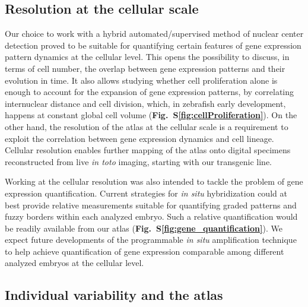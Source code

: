 \subsection*{Resolution at the cellular scale}

Our choice to work with a hybrid automated/supervised method of nuclear center detection proved to be suitable for quantifying certain features of gene expression pattern dynamics at the cellular level. This opens the possibility to discuss, in terms of cell number, the overlap between gene expression patterns and their evolution in time. It also allows studying whether cell proliferation alone is enough to account for the expansion of gene expression patterns, by correlating internuclear distance and cell division, which, in zebrafish early development, happens at constant global cell volume (\textbf{Fig.~S\ref{fig:cellProliferation}}). On the other hand, the resolution of the atlas at the cellular scale is a requirement to exploit the correlation between gene expression dynamics and cell lineage. Cellular resolution enables further mapping of the atlas onto digital specimens reconstructed from live \emph{in toto} imaging, starting with our transgenic line.

Working at the cellular resolution was also intended to tackle the problem of gene expression quantification. Current strategies for \emph{in situ} hybridization could at best provide relative measurements suitable for quantifying graded patterns and fuzzy borders within each analyzed embryo. Such a relative quantification would be readily available from our atlas (\textbf{Fig.~S\ref{fig:gene_quantification}}). We expect future developments of the programmable \emph{in situ} amplification technique\cite{choi2010} to help achieve quantification of gene expression comparable among different analyzed embryos at the cellular level.

\subsection*{Individual variability and the atlas}

